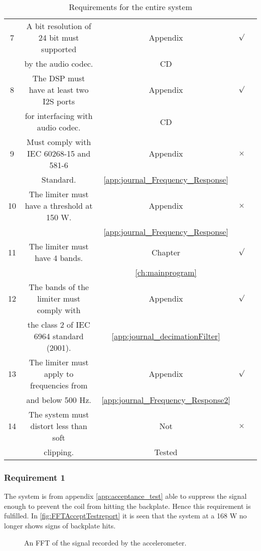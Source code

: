 \begin{table}[H]
\begin{tabular}{|c|c|c|c|c|}
7			&  A bit resolution of 24 bit must supported 	& Appendix								&	$\surd$			\\ 
			&  by the audio codec.			 	 	 		&	CD					 				&					\\ \hline
%
8			& The DSP must have at least two I2S ports 		& Appendix								&	$\surd$			\\ 
			& for interfacing with audio codec.  			& 	CD		 					 		&					\\ \hline
%
9			& Must comply with IEC 60268-15 and 581-6		& Appendix								&	$\times$		\\ 
			& Standard.								  	 	& \ref{app:journal_Frequency_Response}	&					\\ \hline
%
10			& The limiter must have a threshold at 150 W. 	& Appendix								&	$\times$		\\ 
			& 										        & \ref{app:journal_Frequency_Response}	&					\\ \hline

11			& The limiter must have 4 bands. 				& Chapter								&	$\surd$			\\ 
			& 												& \ref{ch:mainprogram}			 		&					\\ \hline

12			& The bands of the limiter  must comply with 	& Appendix								&	$\surd$			\\ 
			& the class 2 of IEC 6964 standard (2001).		& \ref{app:journal_decimationFilter}	&					\\ \hline
%
13			& The limiter must apply to frequencies from	& Appendix								&	$\surd$			\\ 
			& and below 500 Hz. 						 	& \ref{app:journal_Frequency_Response2}	&					\\ \hline
%
14			& The system must distort less than soft  		& Not								&	$\times$		\\ 
			& clipping.										& Tested	&					\\ \hline								
\end{tabular}	
\caption{Requirements for the entire system}
\label{table:acceptancetest}
\end{table}

\subsubsection*{Requirement 1}

The system is from appendix \ref{app:acceptance_test} able to suppress the signal enough to prevent the coil from hitting the backplate. Hence this requirement is fulfilled. In \autoref{fig:FFTAcceptTestreport} it is seen that the system at a 168 W no longer shows signs of backplate hits.
\begin{figure}[H]
	\centering
	
	\caption{An FFT of the signal recorded by the accelerometer.}
	\label{fig:FFTAcceptTestreport}
\end{figure}

